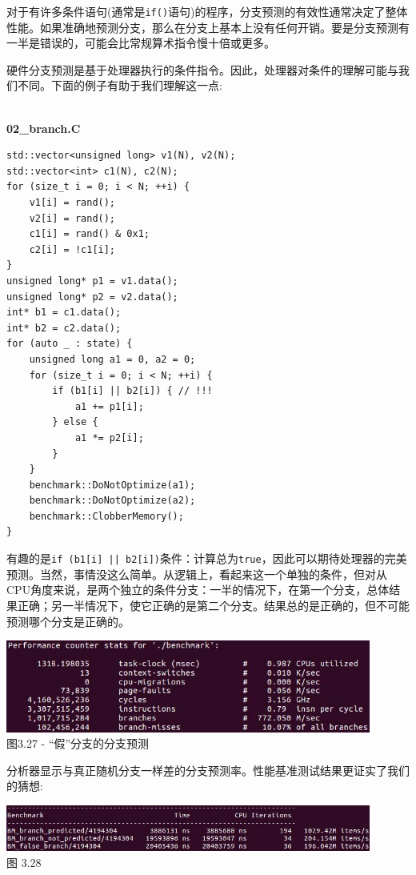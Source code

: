 对于有许多条件语句(通常是\texttt{if()}语句)的程序，分支预测的有效性通常决定了整体性能。如果准确地预测分支，那么在分支上基本上没有任何开销。要是分支预测有一半是错误的，可能会比常规算术指令慢十倍或更多。

硬件分支预测是基于处理器执行的条件指令。因此，处理器对条件的理解可能与我们不同。下面的例子有助于我们理解这一点:

\hspace*{\fill} \\ %
\noindent
\textbf{02\_branch.C}
\begin{lstlisting}[style=styleCXX]
std::vector<unsigned long> v1(N), v2(N);
std::vector<int> c1(N), c2(N);
for (size_t i = 0; i < N; ++i) {
	v1[i] = rand();
	v2[i] = rand();
	c1[i] = rand() & 0x1;
	c2[i] = !c1[i];
}
unsigned long* p1 = v1.data();
unsigned long* p2 = v2.data();
int* b1 = c1.data();
int* b2 = c2.data();
for (auto _ : state) {
	unsigned long a1 = 0, a2 = 0;
	for (size_t i = 0; i < N; ++i) {
		if (b1[i] || b2[i]) { // !!!
			a1 += p1[i];
		} else {
			a1 *= p2[i];
		}
	}
	benchmark::DoNotOptimize(a1);
	benchmark::DoNotOptimize(a2);
	benchmark::ClobberMemory();
}
\end{lstlisting}

有趣的是\texttt{if (b1[i] || b2[i])}条件：计算总为\texttt{true}，因此可以期待处理器的完美预测。当然，事情没这么简单。从逻辑上，看起来这一个单独的条件，但对从CPU角度来说，是两个独立的条件分支：一半的情况下，在第一个分支，总体结果正确；另一半情况下，使它正确的是第二个分支。结果总的是正确的，但不可能预测哪个分支是正确的。

\begin{center}
\includegraphics[width=0.9\textwidth]{content/1/chapter3/images/27.jpg}\\
图3.27 - “假”分支的分支预测
\end{center}

分析器显示与真正随机分支一样差的分支预测率。性能基准测试结果更证实了我们的猜想:

\begin{center}
\includegraphics[width=0.9\textwidth]{content/1/chapter3/images/28.jpg}\\
图 3.28
\end{center}

